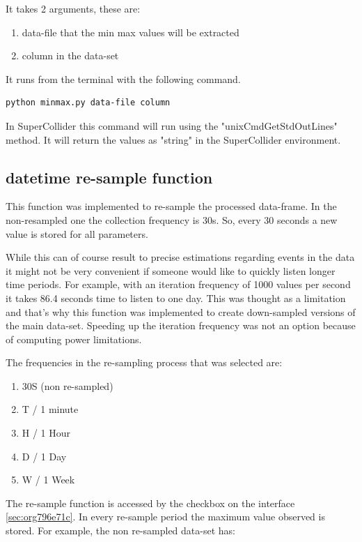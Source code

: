 \documentclass[11pt]{article}
\begin{document}
It takes 2 arguments, these are:
\begin{enumerate}
\item data-file that the min max values will be extracted
\item column in the data-set
\end{enumerate}

It runs from the terminal with the following command.
\begin{verbatim}
python minmax.py data-file column
\end{verbatim}

In SuperCollider this command will run using the "unixCmdGetStdOutLines" method.  It will return the values as "string" in the SuperCollider environment.

\subsection{datetime re-sample function}
\label{sec:org325c404}

This function was implemented to re-sample the processed data-frame.  In the non-resampled one the collection frequency is 30s. So, every 30 seconds a new value is stored for all parameters.

While this can of course result to precise estimations regarding events in the data it might not be very convenient if someone would like to quickly listen longer time periods.  For example, with an iteration frequency of 1000 values per second it takes 86.4 seconds time to listen to one day.  This was thought as a limitation and that's why this function was implemented to create down-sampled versions of the main data-set.  Speeding up the iteration frequency was not an option because of computing power limitations.

The frequencies in the re-sampling process that was selected are:
\begin{enumerate}
\item 30S (non re-sampled)
\item T / 1 minute
\item H / 1 Hour
\item D / 1 Day
\item W / 1 Week
\end{enumerate}

The re-sample function is accessed by the checkbox on the interface \ref{sec:org796e71c}.  In every re-sample period the maximum value observed is stored.  For example, the non re-sampled data-set has:
\end{document}
